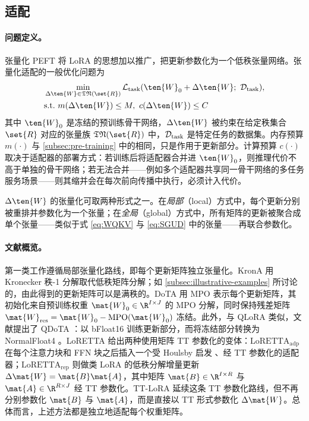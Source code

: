 \subsection{适配}
\label{subsec:peft}

\paragraph{问题定义。}

张量化 PEFT 将 LoRA \cite{hu2022lora} 的思想加以推广，把更新参数化为一个低秩张量网络。张量化适配的一般优化问题为
\begin{equation}
\begin{aligned}
& \min_{\Delta \ten{W} \in \mathfrak{TN}(\set{R})} \mathcal{L}_{\rm task}(\ten{W}_0 + \Delta \ten{W}; \ \mathcal{D}_{\rm task}), \\
& {\rm s.t.} ~ m(\Delta \ten{W}) \leq M,\ c(\Delta \ten{W}) \leq C
\end{aligned}
\end{equation}
其中 $\ten{W}_0$ 是冻结的预训练骨干网络，$\Delta \ten{W}$ 被约束在给定秩集合 $\set{R}$ 对应的张量族 $\mathfrak{TN}(\set{R})$ 中，$\mathcal{D}_{\rm task}$ 是特定任务的数据集。内存预算 $m(\cdot)$ 与 \cref{subsec:pre-training} 中的相同，只是作用于更新部分。计算预算 $c(\cdot)$ 取决于适配器的部署方式：若训练后将适配器合并进 $\ten{W}_0$，则推理代价不高于单独的骨干网络；若无法合并——例如多个适配器共享同一骨干网络的多任务服务场景——则其缩并会在每次前向传播中执行，必须计入代价。

$\Delta \ten{W}$ 的张量化可取两种形式之一。在\emph{局部}（local）方式中，每个更新分别被重排并参数化为一个张量；在\emph{全局}（global）方式中，所有矩阵的更新被聚合成单个张量——类似于式 \eqref{eq:WQKV} 与 \eqref{eq:SGUD} 中的张量——再联合参数化。

\paragraph{文献概览。}

第一类工作遵循局部张量化路线，即每个更新矩阵独立张量化。KronA \cite{edalati2022krona} 用 Kronecker 秩-1 分解取代低秩矩阵分解；如 \cref{subsec:illustrative-examples} 所讨论的，由此得到的更新矩阵可以是满秩的。DoTA \cite{hu2024dota} 用 MPO 表示每个更新矩阵，其初始化来自预训练权重 $\mat{W}_0 \in \R^{I \times J}$ 的 MPO 分解，同时保持残差矩阵 $\mat{W}_{\rm res} = \mat{W}_0 - \operatorname{MPO}(\mat{W}_0)$ 冻结。此外，与 QLoRA \cite{dettmers2023qlora} 类似，文献提出了 QDoTA \cite{hu2024dota}：以 bFloat16 训练更新部分，而将冻结部分转换为 NormalFloat4 \cite{dettmers2023qlora}。LoRETTA \cite{yang2024loretta} 给出两种使用矩阵 TT 参数化的变体：$\text{LoRETTA}_{\text{adp}}$ 在每个注意力块和 FFN 块之后插入一个受 Houlsby 启发 \cite{houlsby2019adapters}、经 TT 参数化的适配器；$\text{LoRETTA}_{\text{rep}}$ 则做类 LoRA 的低秩分解增量更新 $\Delta \mat{W} = \mat{B}\mat{A}$，其中矩阵 $\mat{B} \in \R^{I \times R}$ 与 $\mat{A} \in \R^{R \times J}$ 经 TT 参数化。TT-LoRA \cite{anjum2024ttlora} 延续这条 TT 参数化路线，但不再分别参数化 $\mat{B}$ 与 $\mat{A}$，而是直接以 TT 形式参数化 $\Delta \mat{W}$。总体而言，上述方法都是独立地适配每个权重矩阵。

